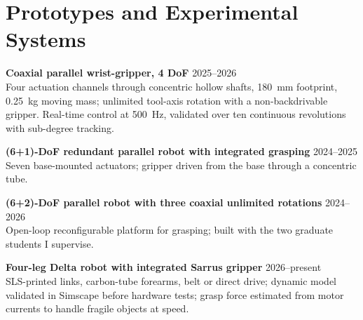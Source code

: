\documentclass[11pt,letterpaper]{article}
\newenvironment{items}{\begin{list}{}{%
  \setlength{\leftmargin}{1.4em}\setlength{\itemindent}{-0.4em}
  \setlength{\itemsep}{0.5pt}\setlength{\parsep}{0pt}\setlength{\topsep}{1pt}}}%
  {\end{list}}
\newcommand{\dateline}[1]{\hfill{\footnotesize\color{cap} #1}}
\begin{document}
\section{Prototypes and Experimental Systems}
\begin{items}
\item[] \textbf{Coaxial parallel wrist-gripper, 4 DoF} \dateline{2025--2026}\\
{\footnotesize Four actuation channels through concentric hollow shafts, 180~mm footprint, 0.25~kg moving mass;
unlimited tool-axis rotation with a non-backdrivable gripper. Real-time control at 500~Hz, validated over ten
continuous revolutions with sub-degree tracking.}
\item[] \textbf{(6+1)-DoF redundant parallel robot with integrated grasping} \dateline{2024--2025}\\
{\footnotesize Seven base-mounted actuators; gripper driven from the base through a concentric tube.}
\item[] \textbf{(6+2)-DoF parallel robot with three coaxial unlimited rotations} \dateline{2024--2026}\\
{\footnotesize Open-loop reconfigurable platform for grasping; built with the two graduate students I supervise.}
\item[] \textbf{Four-leg Delta robot with integrated Sarrus gripper} \dateline{2026--present}\\
{\footnotesize SLS-printed links, carbon-tube forearms, belt or direct drive; dynamic model validated in Simscape before
hardware tests; grasp force estimated from motor currents to handle fragile objects at speed.}
\end{items}

\end{document}
